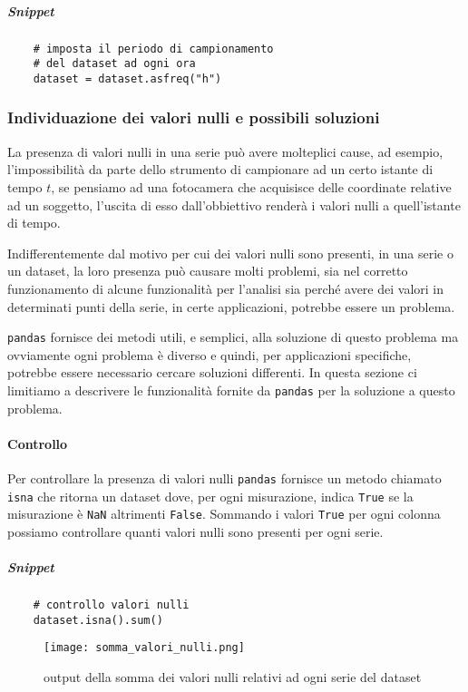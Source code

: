 \subparagraph{Snippet}
\begin{verbatim}
    # imposta il periodo di campionamento 
    # del dataset ad ogni ora
    dataset = dataset.asfreq("h")
\end{verbatim}

\subsubsection{Individuazione dei valori nulli e possibili soluzioni}
La presenza di valori nulli in una serie può avere molteplici cause, ad esempio,
l'impossibilità da parte dello strumento di campionare ad un certo istante di tempo $t$,
se pensiamo ad una fotocamera che acquisisce delle coordinate relative ad un soggetto,
l'uscita di esso dall'obbiettivo renderà i valori nulli a quell'istante di tempo.

Indifferentemente dal motivo per cui dei valori nulli sono presenti, 
in una serie o un dataset, la loro presenza può causare molti
problemi, sia nel corretto funzionamento di alcune funzionalità per l'analisi sia perché
avere dei valori in determinati punti della serie, in certe applicazioni, potrebbe
essere un problema.

\texttt{pandas} fornisce dei metodi utili, e semplici, alla soluzione di questo
problema ma ovviamente ogni problema è diverso e quindi, per applicazioni specifiche,
potrebbe essere necessario cercare soluzioni differenti. In questa sezione ci limitiamo
a descrivere le funzionalità fornite da \texttt{pandas} per la soluzione a questo problema.

\paragraph{Controllo}
Per controllare la presenza di valori nulli \texttt{pandas} fornisce un metodo chiamato
\texttt{isna} che ritorna un dataset dove, per ogni misurazione, indica \texttt{True}
se la misurazione è \texttt{NaN} altrimenti \texttt{False}. Sommando i valori \texttt{True}
per ogni colonna possiamo controllare quanti valori nulli sono presenti per ogni serie.\\

\subparagraph*{Snippet}
\begin{verbatim}
    # controllo valori nulli
    dataset.isna().sum()
\end{verbatim}
\begin{figure}[h!]
    \centering
    \texttt{[image: somma\_valori\_nulli.png]}
    \caption{output della somma dei valori nulli relativi ad ogni serie del dataset}
    \label{fig:sum_null}
\end{figure}

